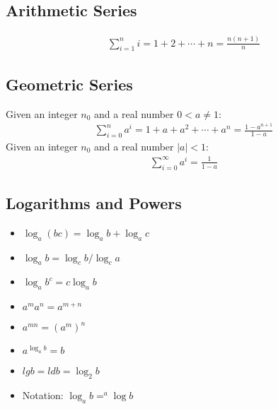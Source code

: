 \subsection{Arithmetic Series}
\begin{align}
    \sum_{i=1}^n i= 1+2+\cdots +n = \frac{n(n+1)}{n} \label{ARSeries}
\end{align}

\subsection{Geometric Series}
Given an integer $n_0$ and a real number $0<a \neq 1$:
\begin{align}
    \sum_{i=0}^n a^{i} = 1 + a + a^2 + \cdots +a^n = \frac{1-a^{n+1}}{1-a} \label{GEOSeries}
\end{align}
Given an integer $n_0$ and a real number $|a|<1$:
\begin{align}
    \sum_{i=0}^\infty a^{i} = \frac{1}{1-a}
\end{align}

\subsection{Logarithms and Powers}
\begin{itemize}
    \item $\log_a(bc)=\log_ab+\log_ac$
    \item $\log_ab=\log_c b / \log_c a$
    \item $\log_a b^c = c \log_a b$
    \item $a^m a^n =a^{m+n}$
    \item $a^{mn}=(a^m)^n $
    \item $a^{\log_a b}=b $
    \item $lg b = ldb = \log_2b $
    \item Notation: $\log_ab= ^{a}\log b$
\end{itemize}